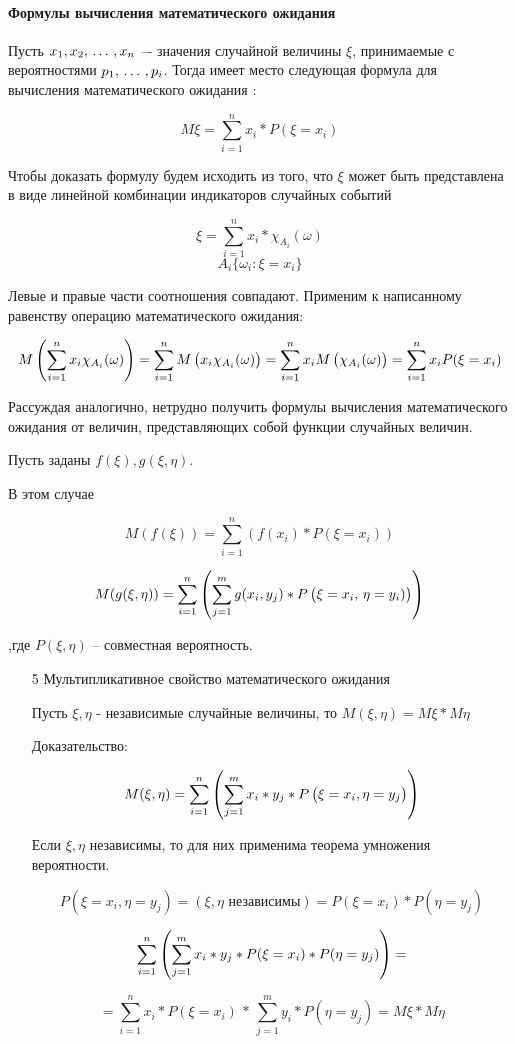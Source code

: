 ﻿\documentclass[a4paper,12pt]{report}
\begin{document}
\paragraph{Формулы вычисления математического ожидания}

	Пусть $x_1,x_2, \,\ldots\, ,x_n$ –-  значения случайной величины $\xi$, принимаемые с вероятностями $p_1, \,\ldots\, ,p_i$. Тогда имеет место следующая формула для вычисления математического ожидания :

	$$
	  M\xi=\sum^n_{i=1}x_i*P(\xi=x_i)
	$$

	Чтобы доказать формулу будем исходить из того, что $\xi$ может быть представлена в виде линейной комбинации индикаторов случайных событий

	$$
	  \xi = \sum^n_{i=1}x_i*\chi_{A_i}(\omega)
	$$ $$
	  A_i \{\omega_i : \xi = x_i\}
	$$

	Левые и правые части соотношения совпадают. Применим к написанному равенству операцию математического ожидания: 

	$$	
	  M\left(\sum^n_{i=1}x_i\chi_{A_i}(\omega)\right) 
	    = \sum^n_{i=1}M\left(x_i\strut\chi_{A_i}(\omega)\right) 
	    = \sum^n_{i=1}x_iM\left(\strut\chi_{A_i}(\omega)\right) 
	    = \sum^n_{i=1}x_iP(\xi=x_i)	
	$$

	Рассуждая аналогично, нетрудно получить формулы вычисления математического ожидания от величин, представляющих собой функции случайных величин. 

	Пусть заданы $f(\xi),g(\xi,\eta)$.

	В этом случае 

	$$
	  M(f(\xi)) = \sum^n_{i=1}(f(x_i)*P(\xi=x_i)) 
	$$

	$$
	  M(g(\xi,\eta)) = \sum^n_{i=1}
	    \left(   
	      \sum^m_{j=1}g(x_i,y_j)*P
	        \left(
	          \xi=x_i,\strut\,\eta=y_i)
	        \right)
	    \right) 
	$$

	,где $P(\xi,\eta)$ – совместная вероятность.


	\begin{enumerate}

	\item[5] Мультипликативное свойство математического ожидания

		Пусть $\xi,\eta$ - независимые случайные величины, то $M(\xi,\eta) =  M\xi * M\eta$

		Доказательство:

		$$
		  M(\xi,\eta) = \sum^n_{i=1}
		    \left(
		      \sum^m_{j=1}x_i*y_j*\strut P
		        \left(
		          \xi=x_i,\strut\eta=y_j
		        \right)
		    \right)
		$$

		Если $\xi,\eta$ независимы, то для них применима теорема умножения вероятности. 

		$$
		  P(\xi=x_i,\eta=y_j) 
		    = (\xi,\eta \mbox{ независимы})
		    = P(\xi=x_i)*P(\eta=y_j)
		$$
		
		$$
		  \sum^n_{i=1}
		    \left(
		      \sum^m_{j=1}x_i*y_j*\strut P(\xi=x_i)*P(\eta=y_j)
		    \right)
		  =
		$$
		
		$$
		  = \sum^n_{i=1}x_i*P(\xi=x_i)  \, * \, 
		    \sum^m_{j=1}y_i*P(\eta=y_j) 
		  = M\xi*M\eta
		$$

	\end{enumerate}
\end{document}
